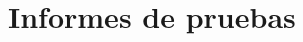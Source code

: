 \documentclass[10pt,spanish]{article}
\let\stdsection\section
\renewcommand\section{\newpage\stdsection}
\newcommand{\manualUsuario}[2]{\href{run:manual_usuario/documento/#1.pdf}{#2}}
\begin{document}
%


%

%

%


\section{Informes de pruebas}\label{sec:informe_pruebas}

\end{document}
